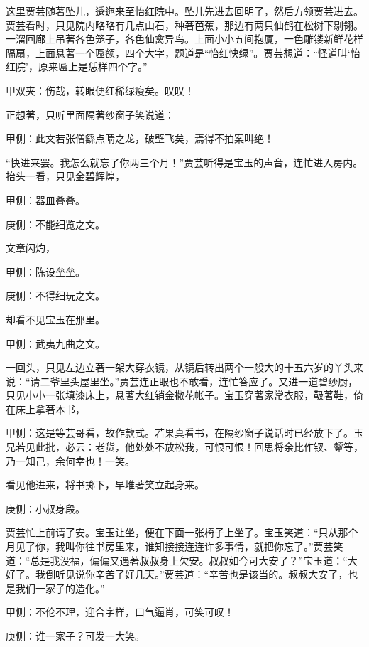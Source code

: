 \begin{parag}
    这里贾芸随著坠儿，逶迤来至怡红院中。坠儿先进去回明了，然后方领贾芸进去。贾芸看时，只见院内略略有几点山石，种著芭蕉，那边有两只仙鹤在松树下剔翎。一溜回廊上吊著各色笼子，各色仙禽异鸟。上面小小五间抱厦，一色雕镂新鲜花样隔扇，上面悬著一个匾额，四个大字，题道是“怡红快绿”。贾芸想道：“怪道叫‘怡红院’，原来匾上是恁样四个字。”\begin{note}甲双夹：伤哉，转眼便红稀绿瘦矣。叹叹！\end{note}正想著，只听里面隔著纱窗子笑说道：\begin{note}甲侧：此文若张僧繇点睛之龙，破壁飞矣，焉得不拍案叫绝！\end{note}“快进来罢。我怎么就忘了你两三个月！”贾芸听得是宝玉的声音，连忙进入房内。抬头一看，只见金碧辉煌，\begin{note}甲侧：器皿叠叠。\end{note}\begin{note}庚侧：不能细览之文。\end{note}文章闪灼，\begin{note}甲侧：陈设垒垒。\end{note}\begin{note}庚侧：不得细玩之文。\end{note}却看不见宝玉在那里。\begin{note}甲侧：武夷九曲之文。\end{note}一回头，只见左边立著一架大穿衣镜，从镜后转出两个一般大的十五六岁的丫头来说：“请二爷里头屋里坐。”贾芸连正眼也不敢看，连忙答应了。又进一道碧纱厨，只见小小一张填漆床上，悬著大红销金撒花帐子。宝玉穿著家常衣服，靸著鞋，倚在床上拿著本书，\begin{note}甲侧：这是等芸哥看，故作款式。若果真看书，在隔纱窗子说话时已经放下了。玉兄若见此批，必云：老货，他处处不放松我，可恨可恨！回思将余比作钗、颦等，乃一知己，余何幸也！一笑。\end{note}看见他进来，将书掷下，早堆著笑立起身来。\begin{note}庚侧：小叔身段。\end{note}贾芸忙上前请了安。宝玉让坐，便在下面一张椅子上坐了。宝玉笑道：“只从那个月见了你，我叫你往书房里来，谁知接接连连许多事情，就把你忘了。”贾芸笑道：“总是我没福，偏偏又遇著叔叔身上欠安。叔叔如今可大安了？”宝玉道：“大好了。我倒听见说你辛苦了好几天。”贾芸道：“辛苦也是该当的。叔叔大安了，也是我们一家子的造化。”\begin{note}甲侧：不伦不理，迎合字样，口气逼肖，可笑可叹！\end{note}\begin{note}庚侧：谁一家子？可发一大笑。\end{note}
\end{parag}


